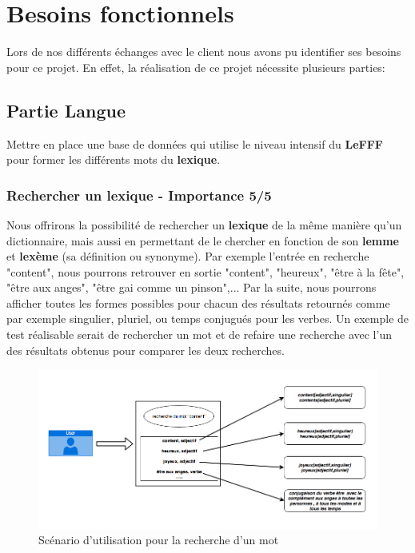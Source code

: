 \section{Besoins fonctionnels}
Lors de nos différents échanges avec le client nous avons pu identifier ses besoins pour ce projet. En effet, la réalisation de ce projet nécessite plusieurs parties:

\subsection{Partie Langue}
Mettre en place une base de données qui utilise le niveau intensif du \textbf{LeFFF} pour former les différents mots du \textbf{lexique}.

\subsubsection{Rechercher un lexique - Importance 5/5}

{Nous offrirons la possibilité de rechercher un \textbf{lexique} de la même manière qu'un dictionnaire, mais aussi en permettant de le chercher en fonction de son \textbf{lemme} et \textbf{lexème} (sa définition ou synonyme). Par exemple l'entrée en recherche "content", nous pourrons retrouver en sortie "content", "heureux", "être à la fête", "être aux anges", "être gai comme un pinson",... Par la suite, nous pourrons afficher toutes les formes possibles pour chacun des résultats retournés comme par exemple singulier, pluriel, ou temps conjugués pour les verbes. Un exemple de test réalisable serait de rechercher un mot et de refaire une recherche avec l'un des résultats obtenus pour comparer les deux recherches.\par}

\begin{figure}[h]
    \centering
    \includegraphics[scale=0.5]{exemple.png}
    \caption{Scénario d'utilisation pour la recherche d'un mot }
\end{figure}
\newpage

